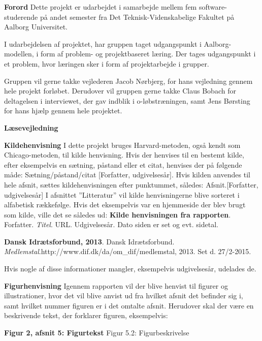 {\Huge\textbf{Forord}}\newline
Dette projekt er udarbejdet i samarbejde mellem fem software-studerende på andet semester fra Det Teknisk-Videnskabelige Fakultet på Aalborg Universitet. 

I udarbejdelsen af projektet, har gruppen taget udgangspunkt i Aalborg-modellen, i form af problem- og projektbaseret læring. Der tages udgangspunkt i et problem, hvor læringen sker i form af projektarbejde i grupper.

Gruppen vil gerne takke vejlederen Jacob Nørbjerg, for hans vejledning gennem hele projekt forløbet. Derudover vil gruppen gerne takke Claus Bobach for deltagelsen i interviewet, der gav indblik i o-løbstræningen, samt Jens Børsting for hans hjælp gennem hele projektet.\newline


{\Huge\textbf{Læsevejledning}}

{\Large\textbf{Kildehenvisning}}\newline
I dette projekt bruges Harvard-metoden, også kendt som Chicago-metoden, til kilde henvisning. Hvis der henvises til en bestemt kilde, efter eksempelvis en sætning, påstand eller et citat, henvises der på følgende måde: Sætning/påstand/citat [Forfatter, udgivelsesår].\newline
Hvis kilden anvendes til hele afsnit, sættes kildehenvisningen efter punktummet, således: Afsnit.[Forfatter, udgivelsesår]\newline
I afsnittet ”Litteratur” vil kilde henvisningerne blive sorteret i alfabetisk rækkefølge. Hvis det eksempelvis var en hjemmeside der blev brugt som kilde, ville det se således ud: \newline
\textbf{Kilde henvisningen fra rapporten}. Forfatter. \textit{Titel}. URL. Udgivelsesår. Dato siden er set og evt. sidetal.

\textbf{Dansk Idrætsforbund, 2013}. Dansk Idrætsforbund. \textit{Medlemstal}.\newline http://www.dif.dk/da/om\_dif/medlemstal, 2013. Set d. 27/2-2015.

Hvis nogle af disse informationer mangler, eksempelvis udgivelsesår, udelades de.

{\Large\textbf{Figurhenvisning}} \newline
Igennem rapporten vil der blive henvist til figurer og illustrationer, hvor det vil blive anvist ud fra hvilket afsnit det befinder sig i, samt hvilket nummer figuren er i det omtalte afsnit. Herudover skal der være en beskrivende tekst, der forklarer figuren, eksempelvis:
\begin{flushleft}
	{\LARGE\textbf{Figur 2, afsnit 5: Figurtekst}}\newline
	Figur 5.2: Figurbeskrivelse
\end{flushleft}
